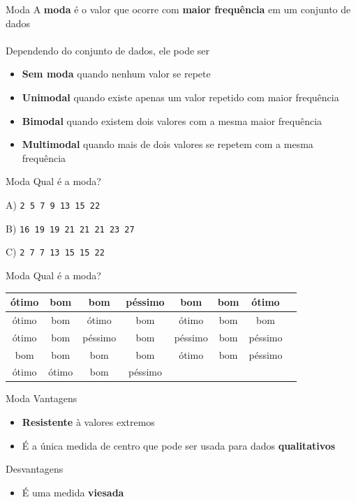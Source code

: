 \documentclass[10pt]{beamer}\usepackage[]{graphicx}\usepackage[]{color}
\theoremstyle{definition}
\begin{document}
\begin{frame}{Moda}
  A \textbf{moda} é o valor que ocorre com \textbf{maior frequência} em
  um conjunto de dados\\~\\
  Dependendo do conjunto de dados, ele pode ser
  \begin{itemize}
  \item \textbf{Sem moda} quando nenhum valor se repete
  \item \textbf{Unimodal} quando existe apenas um valor repetido com
    maior frequência
  \item \textbf{Bimodal} quando existem dois valores com a mesma maior
    frequência
  \item \textbf{Multimodal} quando mais de dois valores se repetem com a
    mesma frequência
  \end{itemize}
\end{frame}

\begin{frame}{Moda}
  Qual é a moda?
  \begin{center}
   A) \texttt{2 5 7 9 13 15 22}
  \end{center}
  \begin{center}
   B) \texttt{16 19 19 21 21 21 23 27}
  \end{center}
    \begin{center}
   C) \texttt{2 7 7 13 15 15 22}
  \end{center}
\end{frame}

\begin{frame}{Moda}
  Qual é a moda?
  \begin{table}[h]
    \centering
    \begin{tabular}{|c|c|c|c|c|c|c|c|}
      \hline
      ótimo & bom & bom & péssimo & bom & bom & ótimo  \\
      \hline
      ótimo & bom & ótimo & bom & ótimo & bom & bom  \\
      \hline
      ótimo & bom & péssimo & bom & péssimo & bom & péssimo  \\
      \hline
      bom & bom & bom & bom & ótimo & bom & péssimo \\
      \hline
      ótimo & ótimo & bom & péssimo & & & \\
      \hline
    \end{tabular}
  \end{table}
\end{frame}

\begin{frame}{Moda}
  Vantagens
  \begin{itemize}
  \item \textbf{Resistente} à valores extremos
  \item É a única medida de centro que pode ser usada para dados
    \textbf{qualitativos}
  \end{itemize}
  Desvantagens
  \begin{itemize}
  \item É uma medida \textbf{viesada}
  \end{itemize}
\end{frame}
\end{document}
